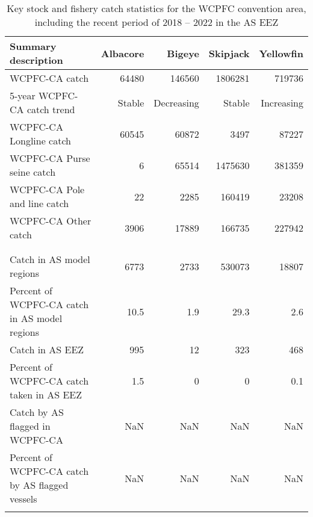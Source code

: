 \begin{longtable}{lrrrr}
\caption{Key stock and fishery catch statistics for the WCPFC convention area, including the recent period of 2018 -- 2022 in the AS EEZ} \\ 
  \hline
Summary description & Albacore & Bigeye & Skipjack & Yellowfin \\ 
  \hline
WCPFC-CA catch & 64480 & 146560 & 1806281 & 719736 \\ 
  5-year WCPFC-CA catch trend & Stable & Decreasing & Stable & Increasing \\ 
  WCPFC-CA Longline catch & 60545 & 60872 & 3497 & 87227 \\ 
  WCPFC-CA Purse seine catch & 6 & 65514 & 1475630 & 381359 \\ 
  WCPFC-CA Pole and line catch & 22 & 2285 & 160419 & 23208 \\ 
  WCPFC-CA Other catch & 3906 & 17889 & 166735 & 227942 \\ 
   &  &  &  &  \\ 
   \hline
 &  &  &  &  \\ 
  Catch in AS model regions & 6773 & 2733 & 530073 & 18807 \\ 
  Percent of WCPFC-CA catch in AS model regions & 10.5 & 1.9 & 29.3 & 2.6 \\ 
  Catch in AS EEZ & 995 & 12 & 323 & 468 \\ 
  Percent of WCPFC-CA catch taken in AS EEZ & 1.5 & 0 & 0 & 0.1 \\ 
  Catch by AS flagged in WCPFC-CA & NaN & NaN & NaN & NaN \\ 
  Percent of WCPFC-CA catch by AS flagged vessels & NaN & NaN & NaN & NaN \\ 
  \hline
\label{cat_sum_tab}
\end{longtable}
